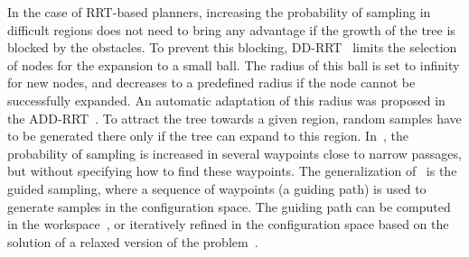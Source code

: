 \documentclass[usletter, 10pt, conference]{ieeeconf} %
\def\C{\mathcal{C}}
\begin{document}

In the case of RRT-based planners, increasing the probability of sampling in difficult regions does not need to bring any advantage
if the growth of the tree is blocked by the obstacles.
To prevent this blocking, DD-RRT~\cite{yershovaDDRRT} limits the selection of nodes for the expansion to a small ball. 
The radius of this ball is set to infinity for new nodes, and decreases to a predefined radius if the node cannot be successfully expanded.
An automatic adaptation of this radius was proposed in the ADD-RRT~\cite{jailletADRRT}.
To attract the tree towards a given region, random samples have to be generated there only if the tree can expand to this region.
In~\cite{kardossRRTKK}, the probability of sampling is increased in several waypoints close to narrow passages, but without specifying how to find these waypoints.
The generalization of~\cite{kardossRRTKK} is the guided sampling, where a sequence of waypoints (a guiding path) is used to generate samples in the configuration space.
The guiding path can be computed in the workspace~\cite{vonasek2009rrt}, or iteratively refined in the configuration space based on the solution of a relaxed version of the problem~\cite{bayazitIRC}.
\end{document}
